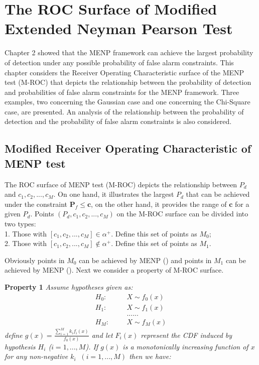 \chapter{The ROC Surface of Modified Extended Neyman Pearson Test}
Chapter 2 showed that the MENP framework can achieve the largest probability of detection under any possible probability of false alarm constraints. This chapter considers the Receiver Operating Characteristic surface of the MENP test (M-ROC) that depicts the relationship between the probability of detection and probabilities of false alarm constraints for the MENP framework. Three examples,  two concerning the Gaussian case and one concerning the Chi-Square case, are presented. An analysis of the relationship between the probability of detection and the probability of false alarm constraints is also considered.  

\section{Modified Receiver Operating Characteristic of MENP test}

The ROC surface of MENP test (M-ROC) depicts the relationship between $P_d$ and $c_1, c_2, ..., c_M$. On one hand, it  illustrates the largest $P_d$ that can be achieved under the constraint $\mathbf{P}_{f} \leq \mathbf{c}$, on the other hand, it provides the range of $\mathbf{c}$ for a given $P_d$.
Points $(P_d, c_1, c_2, ..., c_M)$ on the M-ROC  surface can be divided into two types: 
\\1. Those with $[c_1, c_2, ..., c_M] \in \alpha^+$. Define this set of points as $M_0$; 
\\2. Those with $[c_1, c_2, ..., c_M] \notin \alpha^+$. Define this set of points as $M_1$. 

Obviously points in $M_0$ can be achieved by MENP () and points in $M_1$ can  be achieved by MENP (). Next we consider a property of M-ROC surface.

\noindent \textbf{Property 1}
\noindent \textit{
  \noindent Assume hypotheses given as:
}
\begin{equation}
  \begin{split}
	H_0:\;\;\;\;\;\;&X \sim f_0(x)\\
	H_1:\;\;\;\;\;\;&X \sim f_1(x)\\
	&......\\
	H_M:\;\;\;\;\;\;&X \sim f_M(x)
  \end{split}
\end{equation}
\textit{
  define $g(x) = \frac{\sum_{i=1}^{M}k_if_i(x)}{f_0(x)}$ and let $F_i(x)$ represent the CDF induced by hypothesis $H_i$ ($i = 1, ..., M$). If $g(x)$ is a monotonically increasing function of $x$ for any non-negative $k_i\;\;(i = 1, ..., M)$  then we have:}

